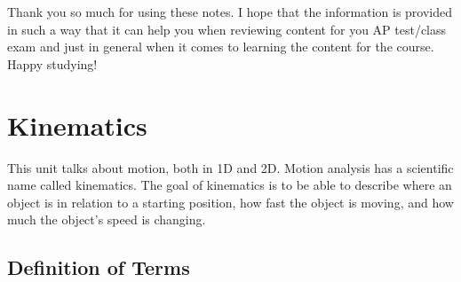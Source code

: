 \documentclass{package/notes}
\begin{document}
Thank you so much for using these notes. I hope that the information is provided in such a way that it can help you when reviewing content for you AP test/class exam and just in general when it comes to learning the content for the course. Happy studying!



\chapter{Kinematics}

This unit talks about motion, both in 1D and 2D. Motion analysis has a scientific name called kinematics. The goal of kinematics is to be able to describe where an object is in relation to a starting position, how fast the object is moving, and how much the object's speed is changing. 

\section{Definition of Terms}
\end{document}
